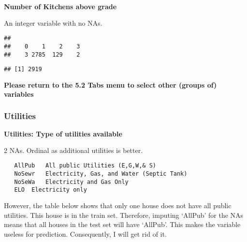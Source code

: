 \documentclass[]{article}
\newenvironment{Shaded}{\begin{snugshade}}{\end{snugshade}}
\newcommand{\KeywordTok}[1]{\textcolor[rgb]{0.13,0.29,0.53}{\textbf{#1}}}
\newcommand{\OperatorTok}[1]{\textcolor[rgb]{0.81,0.36,0.00}{\textbf{#1}}}
\newcommand{\NormalTok}[1]{#1}
\begin{document}
\textbf{Number of Kitchens above grade}

An integer variable with no NAs.

\begin{Shaded}
\end{Shaded}

\begin{verbatim}
## 
##    0    1    2    3 
##    3 2785  129    2
\end{verbatim}

\begin{Shaded}
\end{Shaded}

\begin{verbatim}
## [1] 2919
\end{verbatim}

\textbf{Please return to the 5.2 Tabs menu to select other (groups of)
variables}

\subsubsection{Utilities}\label{utilities}

\textbf{Utilities: Type of utilities available}

2 NAs. Ordinal as additional utilities is better.

\begin{verbatim}
   AllPub   All public Utilities (E,G,W,& S)    
   NoSewr   Electricity, Gas, and Water (Septic Tank)
   NoSeWa   Electricity and Gas Only
   ELO  Electricity only
\end{verbatim}

However, the table below shows that only one house does not have all
public utilities. This house is in the train set. Therefore, imputing
`AllPub' for the NAs means that all houses in the test set will have
`AllPub'. This makes the variable useless for prediction. Consequently,
I will get rid of it.

\begin{Shaded}
\end{Shaded}
\end{document}

